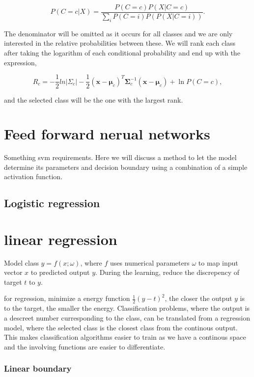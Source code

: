 \begin{equation}
P(C=c|X)= \frac{P(C=c)P(X|C=c)}{\sum_i{P(C=i)P(P(X|C=i))}}.
\end{equation}

The denominator will be omitted as it occurs for all classes and we are only interested in the relative probabilities between these. We will rank each class after taking the logarithm of each conditional probability and end up with the expression,

\begin{equation}
    R_c = -\frac{1}{2}ln{|\Sigma_c|}-\frac{1}{2}(\bm{x}-\bm{\mu}_c)^{T}\bm{\Sigma}_c^{-1}(\bm{x}-\bm{\mu}_c)+\ln{P(C=c)},
\end{equation}

and the selected class will be the one with the largest rank.

\section{Feed forward nerual networks}

Something svm requirements. Here we will discuss a method to let the model determine its parameters and decision boundary using a combination of a simple activation function.

\subsection{Logistic regression}

\section{linear regression}

Model class $y=f(x;\omega)$, where $f$ uses numerical parameters $\omega$ to map input vector $x$ to predicted output $y$. During the learning, reduce the discrepency of target $t$ to $y$.

for regression, minimize a energy function $\frac{1}{2}\left(y-t\right)^2$, the closer the output $y$ is to the target, the smaller the energy. Classification problems, where the output is a descreet number curresponding to the class, can be translated from a regression model, where the selected class is the closest class from the continous output. This makes classification algorithms easier to train as we have a continous space and the involving functions are easier to
differentiate.

\subsubsection{Linear boundary}

